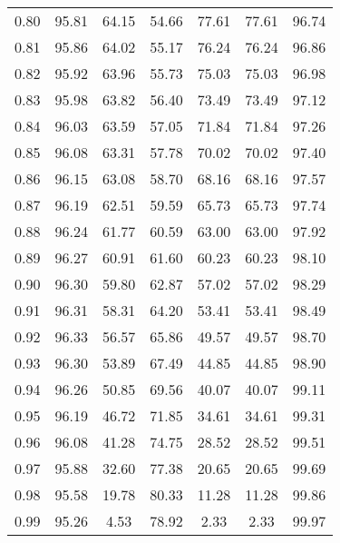 \begin{tabular}{|c|c|c|c|c|c|c|}
      0.80 &     95.81 &     64.15 &      54.66 &   77.61 &      77.61 &         96.74 \\
      0.81 &     95.86 &     64.02 &      55.17 &   76.24 &      76.24 &         96.86 \\
      0.82 &     95.92 &     63.96 &      55.73 &   75.03 &      75.03 &         96.98 \\
      0.83 &     95.98 &     63.82 &      56.40 &   73.49 &      73.49 &         97.12 \\
      0.84 &     96.03 &     63.59 &      57.05 &   71.84 &      71.84 &         97.26 \\
      0.85 &     96.08 &     63.31 &      57.78 &   70.02 &      70.02 &         97.40 \\
      0.86 &     96.15 &     63.08 &      58.70 &   68.16 &      68.16 &         97.57 \\
      0.87 &     96.19 &     62.51 &      59.59 &   65.73 &      65.73 &         97.74 \\
      0.88 &     96.24 &     61.77 &      60.59 &   63.00 &      63.00 &         97.92 \\
      0.89 &     96.27 &     60.91 &      61.60 &   60.23 &      60.23 &         98.10 \\
      0.90 &     96.30 &     59.80 &      62.87 &   57.02 &      57.02 &         98.29 \\
      0.91 &     96.31 &     58.31 &      64.20 &   53.41 &      53.41 &         98.49 \\
      0.92 &     96.33 &     56.57 &      65.86 &   49.57 &      49.57 &         98.70 \\
      0.93 &     96.30 &     53.89 &      67.49 &   44.85 &      44.85 &         98.90 \\
      0.94 &     96.26 &     50.85 &      69.56 &   40.07 &      40.07 &         99.11 \\
      0.95 &     96.19 &     46.72 &      71.85 &   34.61 &      34.61 &         99.31 \\
      0.96 &     96.08 &     41.28 &      74.75 &   28.52 &      28.52 &         99.51 \\
      0.97 &     95.88 &     32.60 &      77.38 &   20.65 &      20.65 &         99.69 \\
      0.98 &     95.58 &     19.78 &      80.33 &   11.28 &      11.28 &         99.86 \\
      0.99 &     95.26 &      4.53 &      78.92 &    2.33 &       2.33 &         99.97 \\
\bottomrule
\end{tabular}
